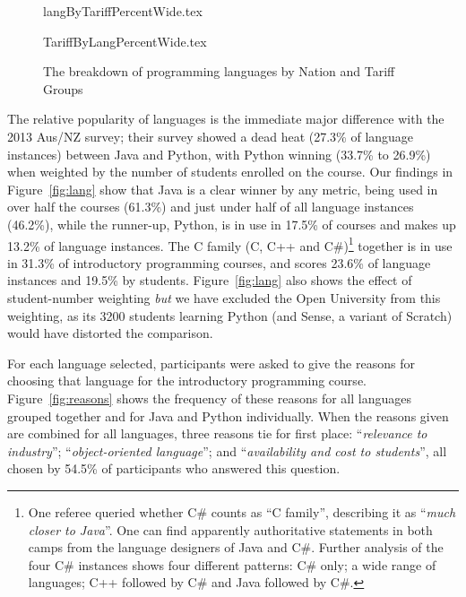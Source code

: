 \documentclass[english]{programming}
\begin{document}
\begin{figure}
\begin{center}
{langByTariffPercentWide.tex}
\end{center}%
%
\begin{center}
{TariffByLangPercentWide.tex}
\end{center}
\caption{The breakdown of programming languages by Nation and Tariff Groups\label{fig;LangTariff}}
\end{figure}

The relative popularity of languages is the immediate major difference
with the 2013 Aus/NZ survey; their survey showed a dead heat (27.3\%
of language instances) between Java and Python, with Python winning
(33.7\% to 26.9\%) when weighted by the number of students enrolled on
the course.  Our findings in Figure~\ref{fig:lang} show that Java is a
clear winner by any metric, being used in over half the courses
(61.3\%) and just under half of all language instances (46.2\%), while
the runner-up, Python, is in use in 17.5\% of courses and makes up
13.2\% of language instances. The C family (C, C++ and
C\#)\footnote{One referee queried whether C\# counts as ``C family'',
describing it as ``{\emph{much closer to Java}}''. One can find apparently
authoritative statements in both camps from the language designers of
Java and C\#. Further analysis of the four C\# instances shows four
different patterns: C\# only; a wide range of languages; C++ followed
by C\# and Java followed by C\#.} together is in use in 31.3\% of
introductory programming courses, and scores 23.6\% of language
instances and 19.5\% by students. Figure~\ref{fig:lang} also shows the
effect of student-number weighting \emph{but} we have excluded the
Open University from this weighting, as its 3200 students learning
Python (and Sense, a variant of Scratch) would have distorted the
comparison.

For each language selected, participants were asked to give the
reasons for choosing that language for the introductory programming
course. Figure~\ref{fig:reasons} shows the frequency of these reasons
for all languages grouped together and for Java and Python
individually. When the reasons given are combined for all languages,
three reasons tie for first place: ``{\emph{relevance to industry}}'';
``{\emph{object-oriented language}}''; and ``{\emph{availability and
cost to students}}'', all chosen by 54.5\% of participants who
answered this question.
\end{document}

